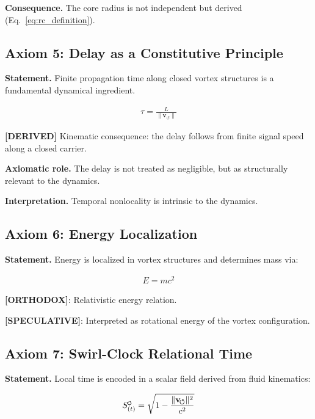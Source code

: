 \documentclass[11pt]{article}
\theoremstyle{definition}
\theoremstyle{plain}
\theoremstyle{remark}
\newcommand{\swirlarrow}{\mathchoice{\mkern-2mu\scriptstyle\boldsymbol{\circlearrowleft}}{\mkern-2mu\scriptstyle\boldsymbol{\circlearrowleft}}{\mkern-2mu\scriptscriptstyle\boldsymbol{\circlearrowleft}}{\mkern-2mu\scriptscriptstyle\boldsymbol{\circlearrowleft}}}
\newcommand{\SwirlClock}{{S_{(t)}^{\swirlarrow}}}
\newcommand{\vnorm}{\lVert \mathbf{v}_{\!\boldsymbol{\circlearrowleft}} \rVert}
\begin{document}
        \textbf{Consequence.}
        The core radius is not independent but derived (Eq.~\ref{eq:rc_definition}).
    
    \subsection{Axiom 5: Delay as a Constitutive Principle}
        
        \textbf{Statement.}
        Finite propagation time along closed vortex structures is a fundamental dynamical ingredient.
        
        \begin{align}
            \tau = \frac{L}{\vnorm}
        \end{align}
        
        \textbf{[DERIVED]} Kinematic consequence: the delay follows from finite signal speed along a closed carrier.

        \textbf{Axiomatic role.} The delay is not treated as negligible, but as structurally relevant to the dynamics.
        
        \textbf{Interpretation.}
        Temporal nonlocality is intrinsic to the dynamics.
    
    \subsection{Axiom 6: Energy Localization}
        
        \textbf{Statement.}
        Energy is localized in vortex structures and determines mass via:
        
        \begin{align}
            E = m c^2
        \end{align}
        
        \textbf{[ORTHODOX]}: Relativistic energy relation.
        
        \textbf{[SPECULATIVE]}: Interpreted as rotational energy of the vortex configuration.
    
    \subsection{Axiom 7: Swirl-Clock Relational Time}
        
        \textbf{Statement.}
        Local time is encoded in a scalar field derived from fluid kinematics:
        
        \begin{align}
            \SwirlClock = \sqrt{1 - \frac{\vnorm^2}{c^2}}
        \end{align}
        
\end{document}
